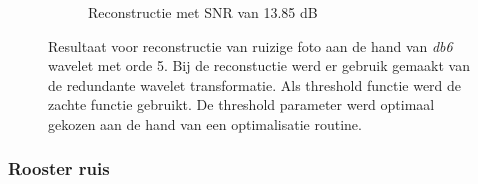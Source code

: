 \begin{figure}
\begin{subfigure}[b]{0.45\textwidth}
        \caption{Reconstructie met SNR van 13.85 dB}
        \label{fig:redundant_fixed}
    \end{subfigure}
    \caption{Resultaat voor reconstructie van ruizige foto aan de hand van  \textit{db6} wavelet met orde 5. Bij de reconstuctie werd er gebruik gemaakt van de redundante wavelet transformatie. Als threshold functie werd de zachte functie gebruikt. De threshold parameter werd optimaal gekozen aan de hand van een optimalisatie routine. }\label{fig:redundant}
\end{figure}










\subsubsection{Rooster ruis}

















